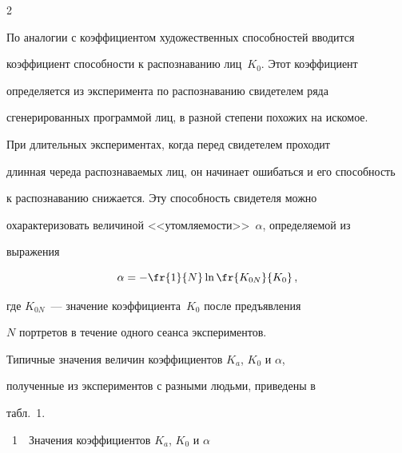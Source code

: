 \begin{multicols}{2}
     


     По аналогии с коэффициентом художественных способностей вводится 


коэффициент способности к распознаванию лиц~$K_0$. Этот коэффициент 


определяется из эксперимента по распознаванию свидетелем ряда 


сгенерированных программой лиц, в разной степени похожих на искомое. 


     


     При длительных экспериментах, когда перед свидетелем проходит 


длинная череда рас\-по\-зна\-ва\-емых лиц, он начинает ошибаться и его способность 


к распознаванию снижается. Эту способность свидетеля можно 


охарактеризовать величиной <<утомляемости>>~$\alpha$, определяемой из 


выражения


     \begin{equation}


     \alpha = -\fr{1}{N}\ln\fr{K_{0N}}{K_0}\,,


     \label{e5pr}


     \end{equation}


     где $K_{0N}$~--- значение коэффициента~$K_0$ после предъявления 


$N$ портретов в течение одного сеанса экспериментов. 





Типичные значения величин коэффициентов  $K_a$, $K_0$ и $\alpha$, 


полученные из  экспериментов с разными людьми, приведены в 


табл.~1. 





\bigskip





{\small\begin{center} %


\noindent


{{\tablename~1}\ \ \small{Значения коэффициентов $K_a$, $K_0$ и  $\alpha$}}


\end{center}







}
\end{multicols}
